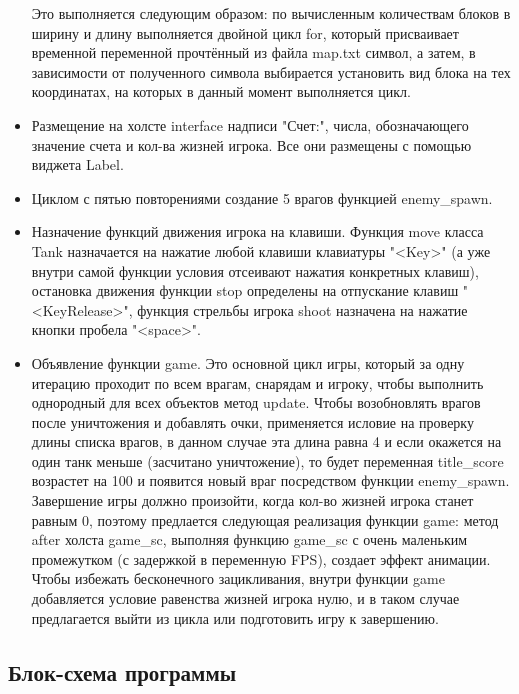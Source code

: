 \begin{itemize}
Это выполняется следующим образом: по вычисленным количествам блоков в ширину и длину выполняется двойной цикл for, который присваивает временной переменной прочтённый из файла map.txt символ, а затем, в зависимости от полученного символа выбирается установить вид блока на тех координатах, на которых в данный момент выполняется цикл.
\item Размещение на холсте interface надписи "Счет:", числа, обозначающего значение счета и кол-ва жизней игрока. Все они размещены с помощью виджета Label.
\item Циклом с пятью повторениями создание 5 врагов функцией enemy\_spawn.
\item Назначение функций движения игрока на клавиши. Функция move класса Tank назначается на нажатие любой клавиши клавиатуры "<Key>" (а уже внутри самой функции условия отсеивают нажатия конкретных клавиш), остановка движения функции stop определены на отпускание клавиш "<KeyRelease>", функция стрельбы игрока shoot назначена на нажатие кнопки пробела "<space>".
\item Объявление функции game. Это основной цикл игры, который за одну итерацию проходит по всем врагам, снарядам и игроку, чтобы выполнить однородный для всех объектов метод update. Чтобы возобновлять врагов после уничтожения и добавлять очки, применяется исловие на проверку длины списка врагов, в данном случае эта длина равна 4 и если окажется на один танк меньше (засчитано уничтожение), то будет переменная title\_score возрастет на 100 и появится новый враг посредством функции enemy\_spawn. Завершение игры должно произойти, когда кол-во жизней игрока станет равным 0, поэтому предлается следующая реализация функции game: метод after холста game\_sc, выполняя функцию game\_sc с очень маленьким промежутком (с задержкой в переменную FPS), создает эффект анимации. Чтобы избежать бесконечного зацикливания, внутри функции game добавляется условие равенства жизней игрока нулю, и в таком случае предлагается выйти из цикла или подготовить игру к завершению.
\end{itemize}

\subsection{\label{sec:ch01/sec03/sub04}
Блок-схема программы}

